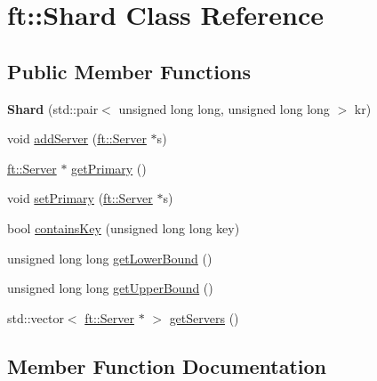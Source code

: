 \hypertarget{classft_1_1Shard}{}\section{ft\+:\+:Shard Class Reference}
\label{classft_1_1Shard}
\subsection*{Public Member Functions}
\begin{DoxyCompactItemize}
\item 
\mbox{\label{classft_1_1Shard_a12f4f5734184d8c7382cbbe66d1d26ed}} 
{\bfseries Shard} (std\+::pair$<$ unsigned long long, unsigned long long $>$ kr)
\item 
void \mbox{\hyperlink{classft_1_1Shard_a2d393309209fc78d93ccf0bb3426c431}{add\+Server}} (\mbox{\hyperlink{classft_1_1Server}{ft\+::\+Server}} $\ast$s)
\item 
\mbox{\hyperlink{classft_1_1Server}{ft\+::\+Server}} $\ast$ \mbox{\hyperlink{classft_1_1Shard_a76b726de0fb962f51f453c68ebe751e3}{get\+Primary}} ()
\item 
void \mbox{\hyperlink{classft_1_1Shard_a9a850b8347f8be6b939f00ee91463da7}{set\+Primary}} (\mbox{\hyperlink{classft_1_1Server}{ft\+::\+Server}} $\ast$s)
\item 
bool \mbox{\hyperlink{classft_1_1Shard_a42e25665d6fc9d6075d0477e3470c293}{contains\+Key}} (unsigned long long key)
\item 
unsigned long long \mbox{\hyperlink{classft_1_1Shard_a5c75dfb7d06ed5ff8a1ceeca7b199576}{get\+Lower\+Bound}} ()
\item 
unsigned long long \mbox{\hyperlink{classft_1_1Shard_adf483639946d24a658d2e07a498e08b2}{get\+Upper\+Bound}} ()
\item 
std\+::vector$<$ \mbox{\hyperlink{classft_1_1Server}{ft\+::\+Server}} $\ast$ $>$ \mbox{\hyperlink{classft_1_1Shard_ac06fd0bca4f4254d114401ecb58d744f}{get\+Servers}} ()
\end{DoxyCompactItemize}


\subsection{Member Function Documentation}
\mbox{\label{classft_1_1Shard_a2d393309209fc78d93ccf0bb3426c431}} 
